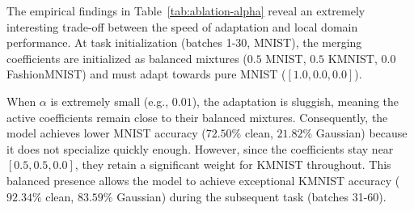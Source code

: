 \documentclass{article}
\theoremstyle{plain}
\theoremstyle{definition}
\theoremstyle{remark}
\begin{document}
\begin{table}[h]
\caption{Sensitivity sweep of the adaptation step size $\alpha$ in MD-OPA under clean and Gaussian noise sequential streams.}
\label{tab:ablation-alpha}
\begin{center}
\begin{small}
\begin{sc}
\end{sc}
\end{small}
\end{center}
\end{table}

The empirical findings in Table~\ref{tab:ablation-alpha} reveal an extremely interesting trade-off between the speed of adaptation and local domain performance. At task initialization (batches 1-30, MNIST), the merging coefficients are initialized as balanced mixtures ($0.5$ MNIST, $0.5$ KMNIST, $0.0$ FashionMNIST) and must adapt towards pure MNIST ($[1.0, 0.0, 0.0]$). 

When $\alpha$ is extremely small (e.g., $0.01$), the adaptation is sluggish, meaning the active coefficients remain close to their balanced mixtures. Consequently, the model achieves lower MNIST accuracy ($72.50\%$ clean, $21.82\%$ Gaussian) because it does not specialize quickly enough. However, since the coefficients stay near $[0.5, 0.5, 0.0]$, they retain a significant weight for KMNIST throughout. This balanced presence allows the model to achieve exceptional KMNIST accuracy ($92.34\%$ clean, $83.59\%$ Gaussian) during the subsequent task (batches 31-60).
\end{document}
